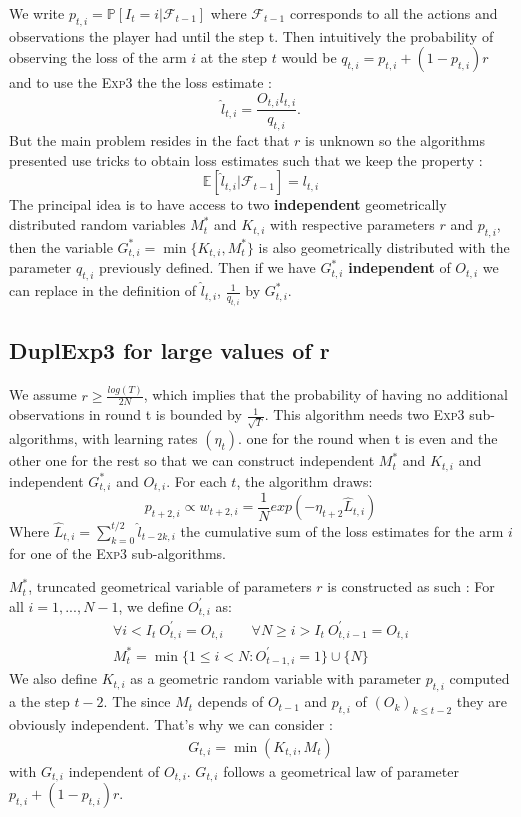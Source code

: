 \documentclass[11pt,a4paper]{article}
\begin{document}
We write $p_{t,i}=\mathbb{P}[I_t=i|\mathcal{F}_{t-1}]$ where $\mathcal{F}_{t-1}$ corresponds to all the actions and observations the player had until the step t. Then intuitively the probability of observing the loss of the arm $i$ at the step $t$ would be $q_{t,i}=p_{t,i} + (1-p_{t,i})r$ and to use the \textsc{Exp}$3$
the the loss estimate :
\[
\hat{l}_{t,i}=\frac{O_{t,i}l_{t,i}}{q_{t,i}}.
\]
But the main problem resides in the fact that $r$ is unknown so the algorithms presented use tricks to obtain loss estimates such that we keep the property :
\[
\mathbb{E}[\hat{l}_{t,i}|\mathcal{F}_{t-1}]=l_{t,i}
\]
The principal idea is to have access to two \textbf{independent} geometrically distributed random variables $M_t^*$ and $K_{t,i}$ with respective parameters $r$ and $p_{t,i}$, then the variable $G_{t,i}^*=\min\{K_{t,i},M_t^*\}$ is also geometrically distributed with the parameter $q_{t,i}$ previously defined. Then if we have $G_{t,i}^*$ \textbf{independent} of $O_{t,i}$ we can replace in the definition of $\hat{l}_{t,i}$, $\frac{1}{q_{t,i}}$ by $G_{t,i}^*$.

\subsection{DuplExp3 for large values of r}
\paragraph{}We assume $ r\geq \frac{log(T)}{2N}$, which implies that the probability of having no additional observations in round t is bounded by $\frac{1}{\sqrt{T}}$.\newline
This algorithm needs two \textsc{Exp3} sub-algorithms, with learning rates $\left(\eta_t\right)$. one for the round when t is even and the other one for the rest so that we can construct independent $M_t^*$ and $K_{t,i}$ and independent $G_{t,i}^*$ and $O_{t,i}$.
For each $t$, the algorithm draws:
\[
p_{t+2,i}\propto w_{t+2,i}= \frac{1}{N} exp\left( -\eta_{t+2} \hat{L}_{t,i} \right)
\]
Where $\hat{L}_{t,i}=\sum_{k=0}^{t/2} \hat{l}_{t-2k,i}$ the cumulative sum of the loss estimates for the arm $i$ for one of the \textsc{Exp3} sub-algorithms.

$M_t^*$, truncated geometrical variable of parameters $r$ is constructed as such : 
For all $i=1,...,N-1$, we define $O_{t,i}^{'}$ as:
\begin{align*}
\forall i<I_{t}\ O_{t,i}^{'}=O_{t,i} \qquad \forall N\geq i>I_{t}\ O_{t,i-1}^{'}=O_{t,i} \\
M_t^* =\min\{1\leq i<N: O_{t-1,i}^{'} =1\}\cup\{N\}
\end{align*}
We also define $K_{t,i}$ as a geometric random variable with parameter $p_{t,i}$ computed a the step $t-2$. The since $M_t$ depends of $O_{t-1}$ and $p_{t,i}$ of $\left(O_k\right)_{k\leq t-2}$ they are obviously independent. That's why we can consider :
\begin{align*}
	G_{t,i}=\min\left(K_{t,i},M_t\right)
\end{align*}
with $G_{t,i}$ independent of $O_{t,i}$. $G_{t,i}$ follows a geometrical law of parameter $p_{t,i}+(1-p_{t,i})r$.
\end{document}
